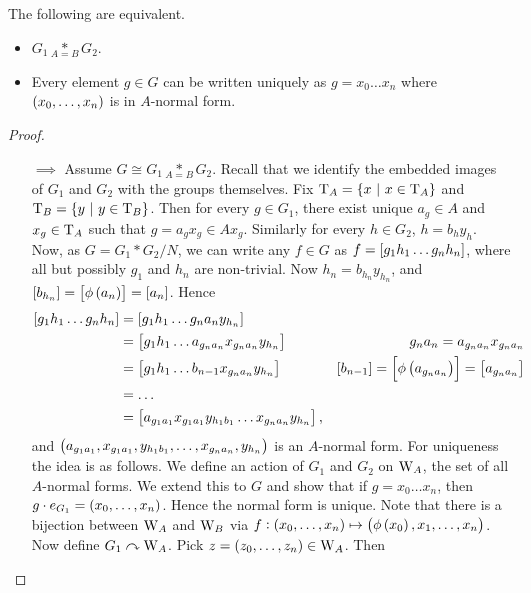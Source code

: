 \pagebreak

\begin{theorem}
The following are equivalent.
\begin{itemize}
\item $ G_1 \underset{A = B}{*} G_2 $.
\item Every element $ g \in G $ can be written uniquely as $ g = x_0 \dots x_n $ where $ \br{x_0, \dots, x_n} $ is in $ A $-normal form.
\end{itemize}
\end{theorem}

\begin{proof}
\hfill
\begin{itemize}
\item[$ \implies $] Assume $ G \cong G_1 \underset{A = B}{*} G_2 $. Recall that we identify the embedded images of $ G_1 $ and $ G_2 $ with the groups themselves. Fix $ \T_A = \cbr{x \st x \in \T_A} $ and $ \T_B = \cbr{y \st y \in \T_B} $. Then for every $ g \in G_1 $, there exist unique $ a_g \in A $ and $ x_g \in \mathrm{T}_A $ such that $ g = a_gx_g \in Ax_g $. Similarly for every $ h \in G_2 $, $ h = b_hy_h $. Now, as $ G = G_1 * G_2 / N $, we can write any $ f \in G $ as $ f = \sbr{g_1h_1 \dots g_nh_n} $, where all but possibly $ g_1 $ and $ h_n $ are non-trivial. Now $ h_n = b_{h_n}y_{h_n} $, and $ \sbr{b_{h_n}} = \sbr{\phi\br{a_n}} = \sbr{a_n} $. Hence
\begin{align*}
\sbr{g_1h_1 \dots g_nh_n}
& = \sbr{g_1h_1 \dots g_na_ny_{h_n}} \\
& = \sbr{g_1h_1 \dots a_{g_na_n}x_{g_na_n}y_{h_n}} & g_na_n = a_{g_na_n}x_{g_na_n} \\
& = \sbr{g_1h_1 \dots b_{n - 1}x_{g_na_n}y_{h_n}} & \sbr{b_{n - 1}} = \sbr{\phi\br{a_{g_na_n}}} = \sbr{a_{g_na_n}} \\
& = \dots \\
& = \sbr{a_{g_1a_1}x_{g_1a_1}y_{h_1b_1} \dots x_{g_na_n}y_{h_n}},
\end{align*}
and $ \br{a_{g_1a_1}, x_{g_1a_1}, y_{h_1b_1}, \dots, x_{g_na_n}, y_{h_n}} $ is an $ A $-normal form. For uniqueness the idea is as follows. We define an action of $ G_1 $ and $ G_2 $ on $ \mathrm{W}_A $, the set of all $ A $-normal forms. We extend this to $ G $ and show that if $ g = x_0 \dots x_n $, then $ g \cdot e_{G_1} = \br{x_0, \dots, x_n} $. Hence the normal form is unique. Note that there is a bijection between $ \mathrm{W}_A $ and $ \mathrm{W}_B $ via $ f : \br{x_0, \dots, x_n} \mapsto \br{\phi\br{x_0}, x_1, \dots, x_n} $. Now define $ G_1 \curvearrowright \mathrm{W}_A $. Pick $ z = \br{z_0, \dots, z_n} \in \W_A $. Then

\end{itemize}
\end{proof}
